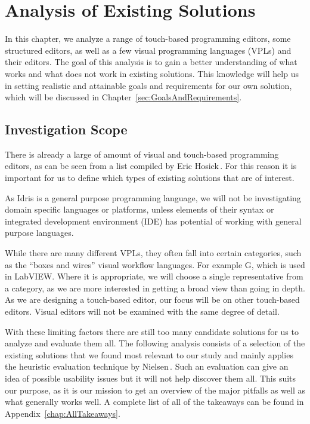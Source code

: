 \chapter{Analysis of Existing Solutions}
\label{sec:Analysis}
In this chapter, we analyze a range of touch-based programming editors, some structured editors, as well as a few visual programming languages (VPLs) and their editors.
The goal of this analysis is to gain a better understanding of what works and what does not work in existing solutions.
This knowledge will help us in setting realistic and attainable goals and requirements for our own solution, which will be discussed in Chapter~\ref{sec:GoalsAndRequirements}.

\section{Investigation Scope}
There is already a large of amount of visual and touch-based programming editors, as can be seen from a list compiled by Eric Hosick\,\cite{hosick2014}.
For this reason it is important for us to define which types of existing solutions that are of interest.

As Idris is a general purpose programming language, we will not be investigating domain specific languages or platforms, unless elements of their syntax or integrated development environment (IDE) has potential of working with general purpose languages.

While there are many different VPLs, they often fall into certain categories, such as the ``boxes and wires'' visual workflow languages. For example G, which is used in LabVIEW.
Where it is appropriate, we will choose a single representative from a category, as we are more interested in getting a broad view than going in depth.
As we are designing a touch-based editor, our focus will be on other touch-based editors. Visual editors will not be examined with the same degree of detail.

With these limiting factors there are still too many candidate solutions for us to analyze and evaluate them all. 
The following analysis consists of a selection of the existing solutions that we found most relevant to our study and mainly applies the heuristic evaluation technique by Nielsen\,\cite{nielsen1990heuristic}. 
Such an evaluation can give an idea of possible usability issues but it will not help discover them all. 
This suits our purpose, as it is our mission to get an overview of the major pitfalls as well as what generally works well.
A complete list of all of the takeaways can be found in
Appendix~\ref{chap:AllTakeaways}.

